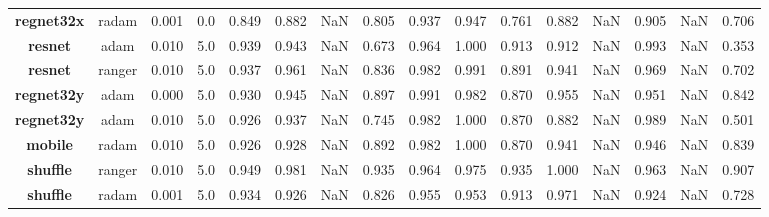 \begin{table}
\begin{tabular}{c|c|c|c|c|c|c|c|c|c|c|c|c|}
\textbf{regnet32x} &   radam &  0.001 &         0.0 &         0.849 &            0.882 &               NaN &                0.805 &           0.937 &              0.947 &           0.761 &              0.882 &             NaN &              0.905 &             NaN &              0.706 \\
\textbf{resnet   } &    adam &  0.010 &         5.0 &         0.939 &            0.943 &               NaN &                0.673 &           0.964 &              1.000 &           0.913 &              0.912 &             NaN &              0.993 &             NaN &              0.353 \\
\textbf{resnet   } &  ranger &  0.010 &         5.0 &         0.937 &            0.961 &               NaN &                0.836 &           0.982 &              0.991 &           0.891 &              0.941 &             NaN &              0.969 &             NaN &              0.702 \\
\textbf{regnet32y} &    adam &  0.000 &         5.0 &         0.930 &            0.945 &               NaN &                0.897 &           0.991 &              0.982 &           0.870 &              0.955 &             NaN &              0.951 &             NaN &              0.842 \\
\textbf{regnet32y} &    adam &  0.010 &         5.0 &         0.926 &            0.937 &               NaN &                0.745 &           0.982 &              1.000 &           0.870 &              0.882 &             NaN &              0.989 &             NaN &              0.501 \\
\textbf{mobile   } &   radam &  0.010 &         5.0 &         0.926 &            0.928 &               NaN &                0.892 &           0.982 &              1.000 &           0.870 &              0.941 &             NaN &              0.946 &             NaN &              0.839 \\
\textbf{shuffle  } &  ranger &  0.010 &         5.0 &         0.949 &            0.981 &               NaN &                0.935 &           0.964 &              0.975 &           0.935 &              1.000 &             NaN &              0.963 &             NaN &              0.907 \\
\textbf{shuffle  } &   radam &  0.001 &         5.0 &         0.934 &            0.926 &               NaN &                0.826 &           0.955 &              0.953 &           0.913 &              0.971 &             NaN &              0.924 &             NaN &              0.728 \\

\end{tabular}
\end{table}
